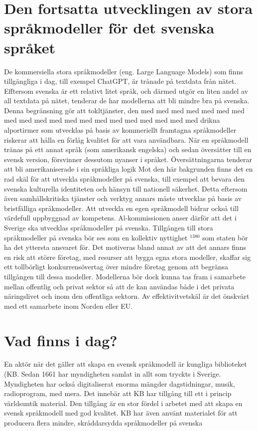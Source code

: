 {{{{{{{{{{{{{\section*{Den fortsatta utvecklingen av stora språkmodeller för det svenska språket}
De kommersiella stora språkmodeller (eng. Large Language Models) som finns tillgängliga i dag, till exempel ChatGPT, är trånade på textdata från nätet. Efftersom svenska är ett relativt litet språk, och därmed utgör en liten andel av all textdata på nätet, tenderar de har modellerna att bli mindre bra på svenska. Denna begränsning gör att tokltjänster, den med med med med med med med med med med med med med med med med med med med med drikna alportirmer som utvecklas på basis av kommeriellt framtagna språkmodeller riskerar att hålla en förlåg kvalitet för att vara användbara. När en språkmodell tränas på ett annat språk (som amerikansk engelska) och sedan översätter till en svensk version, försvinner dessutom nyanser i språket. Översättningarna tenderar att bli amerikaniserade i sin språkliga logik
Mot den här bakgrunden finns det en rad skäl för att utveckla språkmodeller på svenska, till exempel att bevara den svenska kulturella identiteten och hänsyn till nationell säkerhet. Detta eftersom även samhällskritiska tjänster och verktyg annars måste utvecklas på basis av bristfälliga språkmodeller. Att utveckla en egen språkmodell bidrar också till värdefull uppbyggnad av kompetens. Al-kommissionen anser därför att det i Sverige ska utvecklas språkmodeller på svenska.
Tillgången till stora språkmodeller på svenska bör ses som en kollektiv nyttighet \({ }^{1380}\) som staten bör ha det yttersta ansvaret för. Det motiveras bland annat av att det annars finns en risk att större företag, med resurser att bygga egna stora modeller, skaffar sig ett tollbörligt konkurrensövertag över mindre företag genom att begränsa tillgången till dessa modeller. Modellerna bör dock kunna tas fram i samarbete mellan offentlig och privat sektor så att de kan användas både i det privata näringslivet och inom den offentliga sektorn. Av effektivitvetskäl är det önskvärt med ett samarbete inom Norden eller EU.
\section*{Vad finns i dag?}
En aktör när det gäller att skapa en svensk språkmodell är kungliga biblioteket (KB. Sedan 1661 har myndigheten samlat in allt som tryckts i Sverige. Myndigheten har också digitaliserat enorma mängder dagstidningar, musik, radioprogram, med mera. Det innebär att KB har tillgång till ett i princip världsuntik material. Den tillgång är en stor fördel i arbetet med att skapa en svensk språkmodell med god kvalitet. KB har även använt materialet för att producera flera mindre, skråddarsydda språkmodeller på svenska

}}}}}}}}}}}}}

